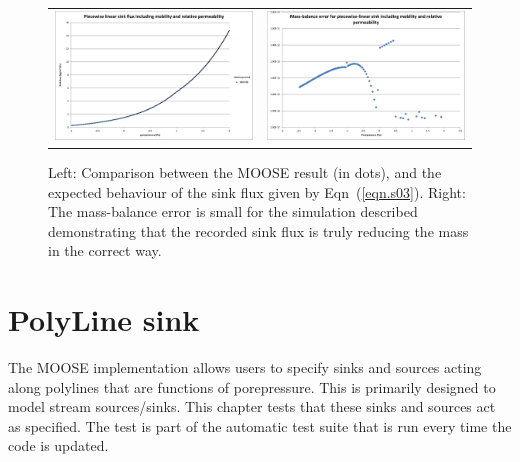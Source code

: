 \documentclass[]{scrreprt}
\begin{document}
\begin{figure}[htb]
\centering
\begin{tabular}{cc}
\includegraphics[width=7cm]{s03.eps} &
\includegraphics[width=7cm]{s03_mass_bal.eps}
\end{tabular}
\caption{Left: Comparison between the MOOSE result (in dots), and the
  expected behaviour of the sink flux given by Eqn~(\ref{eqn.s03}).
  Right: The mass-balance error is small for the simulation described
  demonstrating that the recorded sink flux is truly reducing the mass
  in the correct way.}
\label{s03.fig}
\end{figure}


\chapter{PolyLine sink}
\label{st}

The MOOSE implementation allows users to specify sinks and sources
acting along polylines that are functions of porepressure.  This is
primarily designed to model stream sources/sinks.  This chapter
tests that these sinks and sources act as specified.  The test is
part of the automatic test suite that is run every time the code is
updated.
\end{document}
